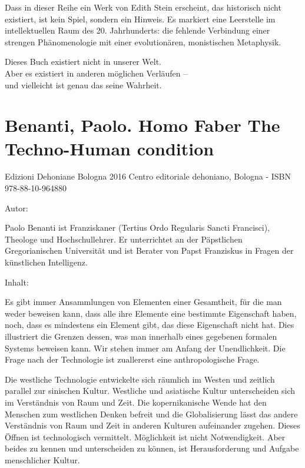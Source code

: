 \documentclass[
]{article}
\begin{document}
Dass in dieser Reihe ein Werk von Edith Stein erscheint, das historisch nicht existiert, ist kein Spiel, sondern ein Hinweis. Es markiert eine Leerstelle im intellektuellen Raum des 20. Jahrhunderts: die fehlende Verbindung einer strengen Phänomenologie mit einer evolutionären, monistischen Metaphysik.

Dieses Buch existiert nicht in unserer Welt.\\
Aber es existiert in anderen möglichen Verläufen --\\
und vielleicht ist genau das seine Wahrheit.

\section{Benanti, Paolo. Homo Faber The Techno-Human condition}\label{benanti-paolo.-homo-faber-the-techno-human-condition}

Edizioni Dehoniane Bologna 2016 Centro editoriale dehoniano, Bologna - ISBN 978-88-10-964880

Autor:

Paolo Benanti ist Franziskaner (Tertius Ordo Regularis Sancti Francisci), Theologe und Hochschullehrer. Er unterrichtet an der Päpstlichen Gregorianischen Universität und ist Berater von Papst Franziskus in Fragen der künstlichen Intelligenz.

Inhalt:

Es gibt immer Ansammlungen von Elementen einer Gesamtheit, für die man weder beweisen kann, dass alle ihre Elemente eine bestimmte Eigenschaft haben, noch, dass es mindestens ein Element gibt, das diese Eigenschaft nicht hat. Dies illustriert die Grenzen dessen, was man innerhalb eines gegebenen formalen Systems beweisen kann. Wir stehen immer am Anfang der Unendlichkeit. Die Frage nach der Technologie ist zuallererst eine anthropologische Frage.

Die westliche Technologie entwickelte sich räumlich im Westen und zeitlich parallel zur sinischen Kultur. Westliche und asiatische Kultur unterscheiden sich im Verständnis von Raum und Zeit. Die kopernikanische Wende hat den Menschen zum westlichen Denken befreit und die Globalisierung lässt das andere Verständnis von Raum und Zeit in anderen Kulturen aufeinander zugehen. Dieses Öffnen ist technologisch vermittelt. Möglichkeit ist nicht Notwendigkeit. Aber beides zu kennen und unterscheiden zu können, ist Herausforderung und Aufgabe menschlicher Kultur.
\end{document}
